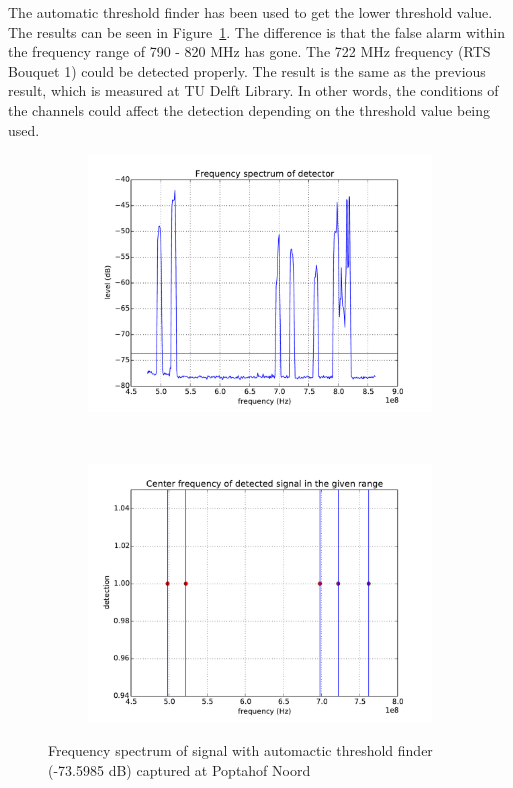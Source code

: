 The automatic threshold finder has been used to get the lower threshold value. The results can be seen in Figure~\ref{fig:popta-freq-auto}. The difference is that the false alarm within the frequency range of 790 - 820 MHz has gone. The 722 MHz frequency (RTS Bouquet 1) could be detected properly. The result is the same as the previous result, which is measured at TU Delft Library.  In other words, the conditions of the channels could affect the detection depending on the threshold value being used.

\begin{figure}[H]
    \centering
    \begin{subfigure}[b]{0.45\textwidth}
        \includegraphics[width=\textwidth]{figures/popta-auto-freq}
    \end{subfigure}
    ~ %
    \begin{subfigure}[b]{0.45\textwidth}
        \includegraphics[width=\textwidth]{figures/popta-auto-center}
    \end{subfigure}
    \caption{Frequency spectrum of signal with automactic threshold finder (-73.5985 dB) captured at Poptahof Noord}\label{fig:popta-freq-auto}
\end{figure}


